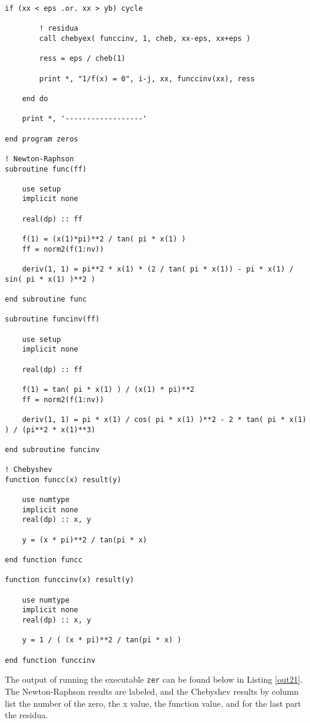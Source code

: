 \documentclass[12pt]{article}
\begin{document}
\begin{lstlisting}[frame=single,caption={{\tt Fortran 90} Code {\tt zeros.f90}},label=zeros]
        if (xx < eps .or. xx > yb) cycle

        ! residua
        call chebyex( funccinv, 1, cheb, xx-eps, xx+eps )

        ress = eps / cheb(1) 

        print *, "1/f(x) = 0", i-j, xx, funccinv(xx), ress

    end do

    print *, '------------------'

end program zeros

! Newton-Raphson
subroutine func(ff)

    use setup
    implicit none
    
    real(dp) :: ff

    f(1) = (x(1)*pi)**2 / tan( pi * x(1) )
    ff = norm2(f(1:nv))
    
    deriv(1, 1) = pi**2 * x(1) * (2 / tan( pi * x(1)) - pi * x(1) / sin( pi * x(1) )**2 )
   
end subroutine func

subroutine funcinv(ff)

    use setup
    implicit none
    
    real(dp) :: ff

    f(1) = tan( pi * x(1) ) / (x(1) * pi)**2
    ff = norm2(f(1:nv))
    
    deriv(1, 1) = pi * x(1) / cos( pi * x(1) )**2 - 2 * tan( pi * x(1) ) / (pi**2 * x(1)**3)
   
end subroutine funcinv

! Chebyshev
function funcc(x) result(y)

    use numtype
    implicit none
    real(dp) :: x, y

    y = (x * pi)**2 / tan(pi * x)

end function funcc

function funccinv(x) result(y)

    use numtype
    implicit none
    real(dp) :: x, y

    y = 1 / ( (x * pi)**2 / tan(pi * x) )

end function funccinv

\end{lstlisting}

The output of running the executable {\tt zer} can be found below in Listing \ref{out21}.  The Newton-Raphson results are labeled, and the Chebyshev results by column list the number of the zero, the x value, the function value, and for the last part the residua.
\end{document}
